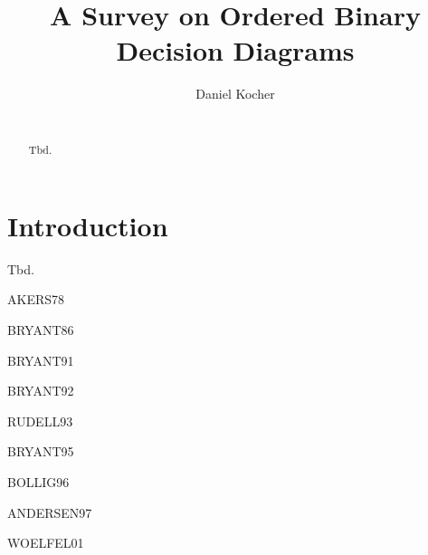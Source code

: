 \documentclass{vldb}
\begin{document}
\title{A Survey on Ordered Binary Decision Diagrams}


\author{
\alignauthor
	Daniel Kocher\\
    \\
}

\maketitle

\begin{abstract}
Tbd.
\end{abstract}

\section{Introduction}   
Tbd. \newline

\noindent AKERS78\cite{AKERS78} \newline

BRYANT86\cite{BRYANT86} \newline

\cite{BRACE90} \newline

BRYANT91\cite{BRYANT91} \newline

\noindent BRYANT92\cite{BRYANT92} \newline

RUDELL93\cite{RUDELL93} \newline

\noindent BRYANT95\cite{BRYANT95} \newline

BOLLIG96\cite{BOLLIG96} \newline

\noindent ANDERSEN97\cite{ANDERSEN97} \newline

WOELFEL01\cite{WOELFEL01} \newline


\balance



\end{document}

